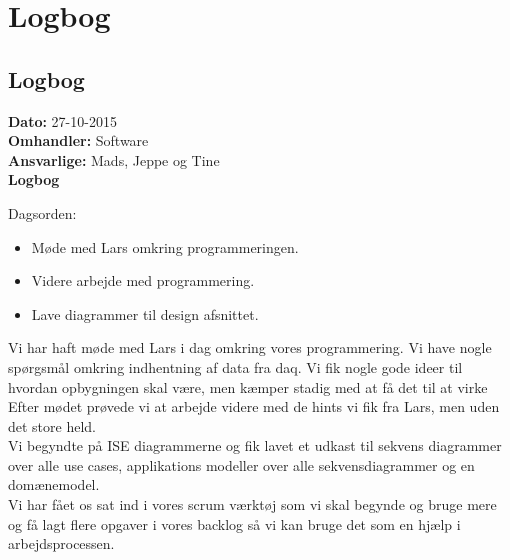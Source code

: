 \chapter{Logbog}
\section{Logbog}

\textbf{Dato:} 27-10-2015 \\
\textbf{Omhandler:} Software \\
\textbf{Ansvarlige:} Mads, Jeppe og Tine \\
\textbf{Logbog}

Dagsorden:
\begin{itemize}
	\item Møde med Lars omkring programmeringen.
	\item Videre arbejde med programmering. 
	\item Lave diagrammer til design afsnittet. 
\end{itemize}

Vi har haft møde med Lars i dag omkring vores programmering. Vi have nogle spørgsmål omkring indhentning af data fra daq. Vi fik nogle gode ideer til hvordan opbygningen skal være, men kæmper stadig med at få det til at virke\\
Efter mødet prøvede vi at arbejde videre med de hints vi fik fra Lars, men uden det store held. \\
Vi begyndte på ISE diagrammerne og fik lavet et udkast til sekvens diagrammer over alle use cases, applikations modeller over alle sekvensdiagrammer og en domænemodel.\\
Vi har fået os sat ind i vores scrum værktøj som vi skal begynde og bruge mere og få lagt flere opgaver i vores backlog så vi kan bruge det som en hjælp i arbejdsprocessen. 
   
